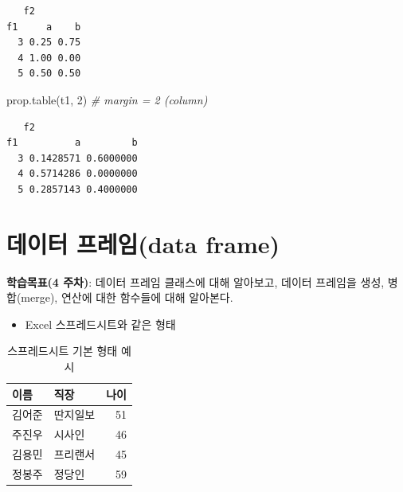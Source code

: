 \documentclass[
  11pt,
]{krantz}
\makeatletter
\newenvironment{Shaded}{\begin{snugshade}}{\end{snugshade}}
\newcommand{\CommentTok}[1]{\textcolor[rgb]{0.37,0.37,0.37}{\textit{#1}}}
\newcommand{\DecValTok}[1]{\textcolor[rgb]{0.06,0.06,0.06}{#1}}
\newcommand{\FunctionTok}[1]{\textcolor[rgb]{0,0,0}{#1}}
\newcommand{\NormalTok}[1]{#1}
\providecommand{\tightlist}{%
  \setlength{\itemsep}{0pt}\setlength{\parskip}{0pt}}
\newenvironment{kframe}{%
\medskip{}
\setlength{\fboxsep}{.8em}
 \def\at@end@of@kframe{}%
 \ifinner\ifhmode%
  \def\at@end@of@kframe{\end{minipage}}%
  \begin{minipage}{\columnwidth}%
 \fi\fi%
 \def\FrameCommand##1{\hskip\@totalleftmargin \hskip-\fboxsep
 \colorbox{shadecolor}{##1}\hskip-\fboxsep
     \hskip-\linewidth \hskip-\@totalleftmargin \hskip\columnwidth}%
 \MakeFramed {\advance\hsize-\width
   \@totalleftmargin\z@ \linewidth\hsize
   \@setminipage}}%
 {\par\unskip\endMakeFramed%
 \at@end@of@kframe}
\newenvironment{rmdblock}[1]
  {
  \begin{itemize}
  \renewcommand{\labelitemi}{
    \raisebox{-.7\height}[0pt][0pt]{
      {\setkeys{Gin}{width=3em,keepaspectratio}\texttt{[image: images/\#1]}}
    }
  }
  \setlength{\fboxsep}{1em}
  \begin{kframe}
  \item
  }
  {
  \end{kframe}
  \end{itemize}
  }
\newenvironment{rmdnote}
  {\begin{rmdblock}{note}}
  {\end{rmdblock}}
\makeatother
\begin{document}
\begin{verbatim}
   f2
f1     a    b
  3 0.25 0.75
  4 1.00 0.00
  5 0.50 0.50
\end{verbatim}

\begin{Shaded}
\begin{Highlighting}[]
\FunctionTok{prop.table}\NormalTok{(t1, }\DecValTok{2}\NormalTok{) }\CommentTok{\# margin = 2 (column)}
\end{Highlighting}
\end{Shaded}

\begin{verbatim}
   f2
f1          a         b
  3 0.1428571 0.6000000
  4 0.5714286 0.0000000
  5 0.2857143 0.4000000
\end{verbatim}

\normalsize

\hypertarget{data-frame}{%
\section{데이터 프레임(data frame)}\label{data-frame}}

\footnotesize

\begin{rmdnote}
\textbf{학습목표(4 주차)}: 데이터 프레임 클래스에 대해 알아보고, 데이터 프레임을 생성, 병합(merge), 연산에 대한 함수들에 대해 알아본다.
\end{rmdnote}

\normalsize

\begin{itemize}
\tightlist
\item
  Excel 스프레드시트와 같은 형태
\end{itemize}

\footnotesize

\begin{table}

\caption{\label{tab:unnamed-chunk-61}스프레드시트 기본 형태 예시}
\centering
\begin{tabular}[t]{l|l|r}
\hline
이름 & 직장 & 나이\\
\hline
김어준 & 딴지일보 & 51\\
\hline
주진우 & 시사인 & 46\\
\hline
김용민 & 프리랜서 & 45\\
\hline
정봉주 & 정당인 & 59\\
\hline
\end{tabular}
\end{table}
\end{document}
